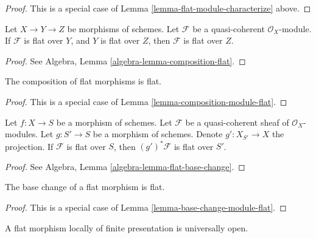 \begin{proof}
This is a special case of Lemma \ref{lemma-flat-module-characterize}
above.
\end{proof}

\begin{lemma}
\label{lemma-composition-module-flat}
Let $X \to Y \to Z$ be morphisms of schemes.
Let $\mathcal{F}$ be a quasi-coherent $\mathcal{O}_X$-module.
If $\mathcal{F}$ is flat over $Y$, and $Y$ is flat over $Z$, then
$\mathcal{F}$ is flat over $Z$.
\end{lemma}

\begin{proof}
See Algebra, Lemma \ref{algebra-lemma-composition-flat}.
\end{proof}

\begin{lemma}
\label{lemma-composition-flat}
The composition of flat morphisms is flat.
\end{lemma}

\begin{proof}
This is a special case of Lemma \ref{lemma-composition-module-flat}.
\end{proof}

\begin{lemma}
\label{lemma-base-change-module-flat}
Let $f : X \to S$ be a morphism of schemes. Let $\mathcal{F}$ be a
quasi-coherent sheaf of $\mathcal{O}_X$-modules.
Let $g : S' \to S$ be a morphism of schemes. Denote
$g' : X_{S'} \to X$ the projection. If $\mathcal{F}$ is flat
over $S$, then $(g')^*\mathcal{F}$ is flat over $S'$.
\end{lemma}

\begin{proof}
See Algebra, Lemma \ref{algebra-lemma-flat-base-change}.
\end{proof}

\begin{lemma}
\label{lemma-base-change-flat}
The base change of a flat morphism is flat.
\end{lemma}

\begin{proof}
This is a special case of Lemma \ref{lemma-base-change-module-flat}.
\end{proof}

\begin{lemma}
\label{lemma-fppf-open}
A flat morphism locally of finite presentation is universally open.
\end{lemma}

